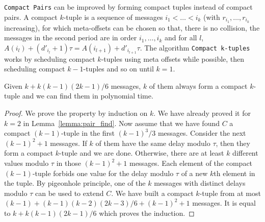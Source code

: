 \documentclass[a4paper,cleveref, autoref, thm-restate,UKenglish]{lipics-v2019}
\newcommand\compactpair{\texttt{Compact Pairs}\xspace}
\begin{document}
\compactpair can be improved by forming compact tuples instead of compact pairs.
A compact $k$-tuple is a sequence of messages $i_1 < \dots < i_k$ (with $r_{i_1},\dots,r_{i_k}$ increasing), for which meta-offsets can be chosen so that, there is no collision, the messages in the second period are in order $i_1,\dots,i_k$ and for all $l$, $A(i_l) + (d'_{i_l} + 1)\tau = A(i_{l+1}) + d'_{i_{l+1}}\tau$.
The algorithm \texttt{Compact k-tuples} works by scheduling compact $k$-tuples
using meta offsets while possible, then scheduling compact $k-1$-tuples and so on until $k=1$.


\begin{lemma}\label{lemma:uple_find}
Given $k + k(k-1)(2k-1)/6$ messages, $k$ of them always form a compact $k$-tuple and we can find them in polynomial time. 
\end{lemma}
\begin{proof}
We prove the property by induction on $k$. We have already proved it for $k=2$ in Lemma~\ref{lemma:pair_find}.
Now assume that we have found $C$ a compact $(k-1)$-tuple in the first $(k-1)^3/3$
messages. Consider the next $(k-1)^2 + 1$ messages. If $k$ of them have the same delay modulo $\tau$,
then they form a compact $k$-tuple and we are done. Otherwise, there are at least $k$ different values modulo $\tau$
in those $(k-1)^2 + 1$ messages. Each element of the compact $(k-1)$-tuple forbids one value for the delay modulo $\tau$ of a new $k$th element in the tuple. By pigeonhole principle, one of the $k$ messages with distinct delays modulo $\tau$ can be used to extend $C$. We have built a compact $k$-tuple from at most $(k-1) + (k-1)(k-2)(2k-3)/6 + (k-1)^2 + 1$ messages.
It is equal to $k + k(k-1)(2k-1)/6$ which proves the induction.
\end{proof}
\end{document}
